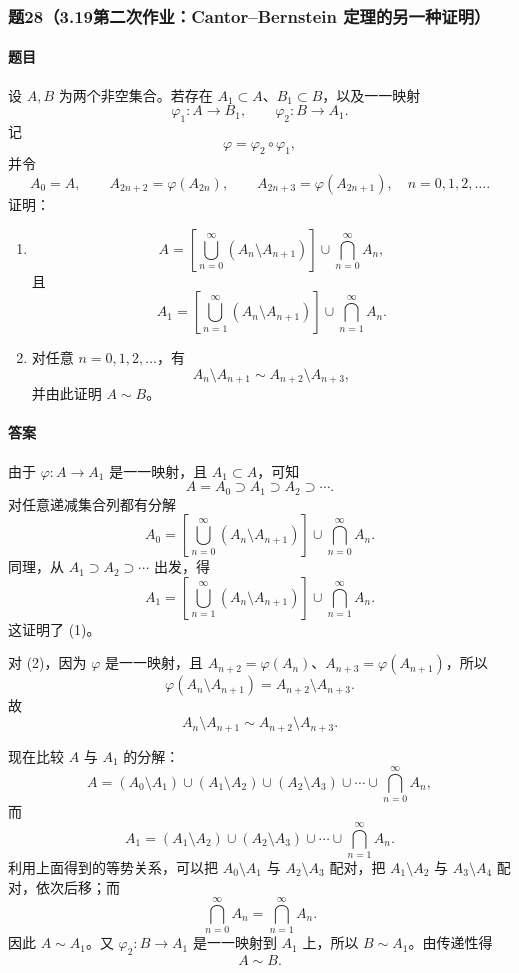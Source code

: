 \documentclass{article}
\begin{document}
	\subsubsection*{题28（3.19第二次作业：Cantor--Bernstein 定理的另一种证明）}
	\paragraph{题目}设 $A,B$ 为两个非空集合。若存在 $A_1\subset A$、$B_1\subset B$，以及一一映射
	\[
	\varphi_1:A\to B_1,
	\qquad
	\varphi_2:B\to A_1.
	\]
	记
	\[
	\varphi=\varphi_2\circ\varphi_1,
	\]
	并令
	\[
	A_0=A,
	\qquad
	A_{2n+2}=\varphi(A_{2n}),
	\qquad
	A_{2n+3}=\varphi(A_{2n+1}),
	\quad n=0,1,2,\ldots.
	\]
	证明：
	\begin{enumerate}[label=(\arabic*)]
		\item
		\[
		A=\left[\bigcup_{n=0}^{\infty}(A_n\setminus A_{n+1})\right]
		\cup \bigcap_{n=0}^{\infty}A_n,
		\]
		且
		\[
		A_1=\left[\bigcup_{n=1}^{\infty}(A_n\setminus A_{n+1})\right]
		\cup \bigcap_{n=1}^{\infty}A_n.
		\]
		\item 对任意 $n=0,1,2,
		\ldots$，有
		\[
		A_n\setminus A_{n+1}\sim A_{n+2}\setminus A_{n+3},
		\]
		并由此证明 $A\sim B$。
	\end{enumerate}
	
	\paragraph{答案}由于 $\varphi:A\to A_1$ 是一一映射，且 $A_1\subset A$，可知
	\[
	A=A_0\supset A_1\supset A_2\supset\cdots.
	\]
	对任意递减集合列都有分解
	\[
	A_0=\left[\bigcup_{n=0}^{\infty}(A_n\setminus A_{n+1})\right]\cup\bigcap_{n=0}^{\infty}A_n.
	\]
	同理，从 $A_1\supset A_2\supset\cdots$ 出发，得
	\[
	A_1=\left[\bigcup_{n=1}^{\infty}(A_n\setminus A_{n+1})\right]\cup\bigcap_{n=1}^{\infty}A_n.
	\]
	这证明了 (1)。
	
	对 (2)，因为 $\varphi$ 是一一映射，且 $A_{n+2}=\varphi(A_n)$、$A_{n+3}=\varphi(A_{n+1})$，所以
	\[
	\varphi(A_n\setminus A_{n+1})=A_{n+2}\setminus A_{n+3}.
	\]
	故
	\[
	A_n\setminus A_{n+1}\sim A_{n+2}\setminus A_{n+3}.
	\]
	
	现在比较 $A$ 与 $A_1$ 的分解：
	\[
	A=(A_0\setminus A_1)\cup(A_1\setminus A_2)\cup(A_2\setminus A_3)\cup\cdots\cup\bigcap_{n=0}^{\infty}A_n,
	\]
	而
	\[
	A_1=(A_1\setminus A_2)\cup(A_2\setminus A_3)\cup\cdots\cup\bigcap_{n=1}^{\infty}A_n.
	\]
	利用上面得到的等势关系，可以把 $A_0\setminus A_1$ 与 $A_2\setminus A_3$ 配对，把 $A_1\setminus A_2$ 与 $A_3\setminus A_4$ 配对，依次后移；而
	\[
	\bigcap_{n=0}^{\infty}A_n=\bigcap_{n=1}^{\infty}A_n.
	\]
	因此 $A\sim A_1$。又 $\varphi_2:B\to A_1$ 是一一映射到 $A_1$ 上，所以 $B\sim A_1$。由传递性得
	\[
	A\sim B.
	\]
	
\end{document}
